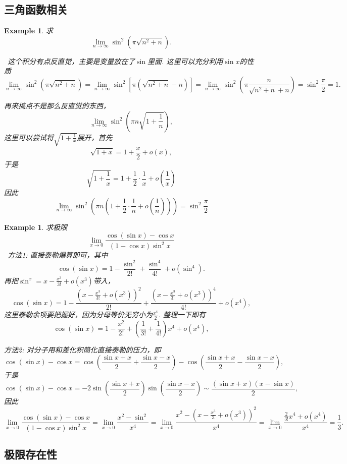 \documentclass{article}
\newtheorem{example}[theorem]{Example}
\newcommand{\hints}{{\color{blue} \text{hints}}}
\begin{document}
\subsection{三角函数相关}

\begin{example}
\rm 求
$$
\lim\limits_{n \to \infty} \sin^2(\pi \sqrt{n^2+n}). 
$$

\hints\ 这个积分有点反直觉，主要是变量放在了$\sin$里面. 这里可以充分利用$\sin x$的性质
$$
\lim\limits_{n \to \infty} \sin^2(\pi \sqrt{n^2+n}) = \lim\limits_{n \to \infty} \sin^2[\pi(\sqrt{n^2 + n} -n)] = \lim\limits_{n \to \infty} \sin^2\left(\pi \frac{n}{\sqrt{n^2+n}+n} \right) = \sin^2 \frac{\pi}{2} = 1. 
$$

再来搞点不是那么反直觉的东西，
$$
\lim\limits_{n \to \infty} \sin^2 \left(\pi n \sqrt{1+\frac{1}{n}} \right),
$$
这里可以尝试将$\sqrt{1+\frac{1}{x}}$展开，首先
$$
\sqrt{1+x} = 1  + \frac{x}{2}+o(x),
$$
于是
$$
\sqrt{1+\frac{1}{x}} = 1 + \frac{1}{2}\cdot\frac{1}{x} + o(\frac{1}{x})
$$
因此
$$
\lim\limits_{n \to \infty} \sin^2 \left(\pi n (1 + \frac{1}{2}\cdot\frac{1}{n}+o(\frac{1}{n})) \right) = \sin^2\frac{\pi}{2}
$$
\end{example}

\begin{example}
\rm 求极限
$$
\lim\limits_{x \to 0} \frac{\cos(\sin x)-\cos x}{(1-\cos x)\sin^2 x}
$$
\hints\ 方法1: 直接泰勒爆算即可，其中
$$
\cos(\sin x) = 1 - \frac{\sin^2}{2!} + \frac{\sin^4}{4!} + o(\sin^4). 
$$
再把$\sin ^x = x -\frac{x^3}{3!} + o(x^3)$带入，
$$
\cos(\sin x) = 1 - \frac{(x -\frac{x^3}{3!} + o(x^3))^2}{2!} + \frac{(x -\frac{x^3}{3!} + o(x^3))^4}{4!} + o(x^4),
$$
这里泰勒余项要把握好，因为分母等价无穷小为$\frac{x^4}{2}$. 整理一下即有
$$
\cos(\sin x) = 1-\frac{x^2}{2!} + (\frac{1}{3!}+\frac{1}{4!})x^4 + o(x^4),
$$

方法2: 对分子用和差化积简化直接泰勒的压力，即
$$
\cos(\sin x)-\cos x = \cos\left( \frac{\sin x+x}{2} + \frac{\sin x-x}{2} \right) - \cos\left( \frac{\sin x+x}{2} - \frac{\sin x-x}{2} \right),
$$
于是
$$
\cos(\sin x)-\cos x  = -2\sin\left( \frac{\sin x+x}{2}  \right)\sin\left( \frac{\sin x-x}{2}\right) \sim \frac{(\sin x+x)(x-\sin x)}{2},
$$
因此
$$
\lim\limits_{x \to 0} \frac{\cos(\sin x)-\cos x}{(1-\cos x)\sin^2 x} = \lim\limits_{x \to 0} \frac{x^2 - \sin^2}{x^4} =  \lim\limits_{x \to 0} \frac{x^2-(x-\frac{x^3}{3}+o(x^3))^2}{x^4} = \lim\limits_{x \to 0} \frac{\frac{2}{3!}x^4 + o(x^4)}{x^4} = \frac{1}{3}.
$$
\end{example}


\subsection{极限存在性}
\end{document}
